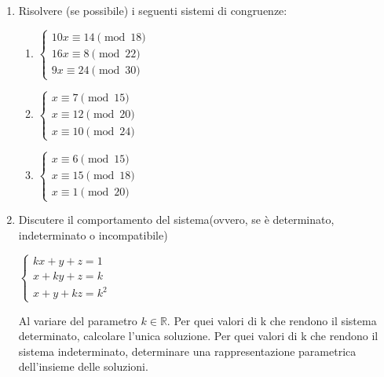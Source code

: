 \documentclass[fleqn]{article}
\begin{document}
\begin{enumerate}
    \item Risolvere (se possibile) i seguenti sistemi di congruenze:
   
    \begin{enumerate} 
       \item \begin{center} 
       $ \begin{cases}
          10x \equiv 14 \pmod{18} \\
          16x \equiv 8 \pmod{22} \\
          9x \equiv 24 \pmod{30} 
       \end{cases} $
       \end{center}
       \item \begin{center} 
       $ \begin{cases}
          x \equiv 7 \pmod{15} \\
          x \equiv 12 \pmod{20} \\
          x \equiv 10 \pmod{24} 
       \end{cases} $
       \end{center}
       \item \begin{center}
       $ \begin{cases}
          x \equiv 6 \pmod{15} \\
          x \equiv 15 \pmod{18} \\
          x \equiv 1 \pmod{20} 
       \end{cases} $
       \end{center}
    \end{enumerate}

    \item Discutere il comportamento del sistema(ovvero, se è determinato, indeterminato o incompatibile)
    \begin{center}
    $\begin{cases} 
       kx + y + z = 1 \\
       x + ky + z  = k \\
       x + y + kz = k^2
    \end{cases}$ \\
    \end{center}
    Al variare del parametro $k \in \mathbb{R}$. Per quei valori di k che rendono il sistema determinato,
    calcolare l'unica soluzione. Per quei valori di k che rendono il sistema indeterminato, determinare
    una rappresentazione parametrica dell'insieme delle soluzioni.


\end{enumerate}
\end{document}

